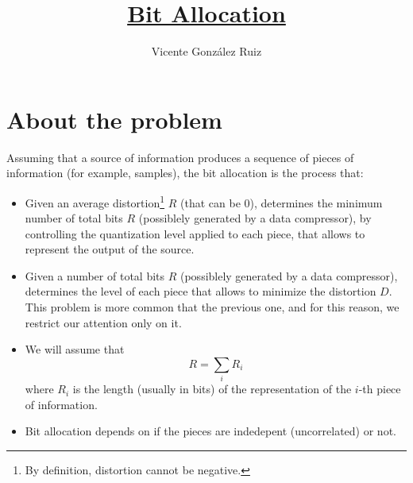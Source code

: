 
\title{\href{https://github.com/vicente-gonzalez-ruiz/bit_allocation}{Bit Allocation}}

\author{Vicente González Ruiz}

\maketitle

\section{About the problem}
Assuming that a source of information produces a sequence of pieces of
information (for example, samples), the bit allocation is the process
that:
\begin{itemize}
\item Given an average distortion\footnote{By definition, distortion
  cannot be negative.} $R$ (that can be 0), determines the minimum
  number of total bits $R$ (possiblely generated by a data
  compressor), by controlling the quantization level applied to each
  piece, that allows to represent the output of the source.
\item Given a number of total bits $R$ (possiblely generated by a data
  compressor), determines the 
  level of each piece that allows to minimize the distortion $D$. This
  problem is more common that the previous one, and for this reason,
  we restrict our attention only on it.
\item We will assume that
  \begin{equation}
    R=\sum_i R_i
  \end{equation}
  where $R_i$ is the length (usually in bits) of the representation of
  the $i$-th piece of information.
\item Bit allocation depends on if the pieces are indedepent
  (uncorrelated) or not.
\end{itemize}

